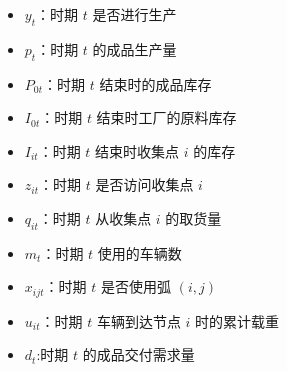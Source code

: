\documentclass{article}
\begin{document}
\begin{itemize}
    \item $y_t $：时期 $t$ 是否进行生产
    \item $p_t$：时期 $t$ 的成品生产量
    \item $P_{0t}$：时期 $t$ 结束时的成品库存
    \item $I_{0t}$：时期 $t$ 结束时工厂的原料库存
    \item $I_{it}$：时期 $t$ 结束时收集点 $i$ 的库存
    \item $z_{it} $：时期 $t$ 是否访问收集点 $i$
    \item $q_{it}$：时期 $t$ 从收集点 $i$ 的取货量
    \item $m_t$：时期 $t$ 使用的车辆数
    \item $x_{ijt} $：时期 $t$ 是否使用弧 $(i,j)$
    \item $u_{it}$：时期 $t$ 车辆到达节点 $i$ 时的累计载重
    \item $d_t$:时期 $t$ 的成品交付需求量
\end{itemize}
\end{document}
